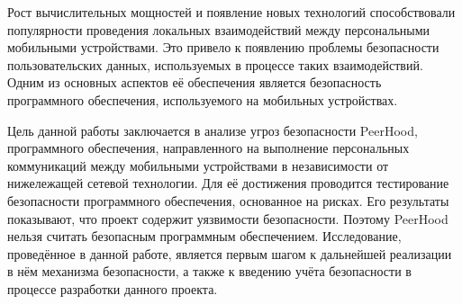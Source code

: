 %
Рост вычислительных мощностей и появление новых технологий способствовали популярности проведения локальных взаимодействий между персональными мобильными устройствами. 
%
Это привело к появлению проблемы безопасности пользовательских данных, используемых в процессе таких взаимодействий. 
%
Одним из основных аспектов её обеспечения является безопасность программного обеспечения, используемого на мобильных устройствах. 

%
Цель данной работы заключается в анализе угроз безопасности PeerHood, программного обеспечения, направленного на выполнение персональных коммуникаций между мобильными устройствами в независимости от нижележащей сетевой технологии. 
%
Для её достижения проводится тестирование безопасности программного обеспечения, основанное на рисках. 
%
Его результаты показывают, что проект содержит уязвимости безопасности.
%
Поэтому PeerHood нельзя считать безопасным программным обеспечением. 
%
Исследование, проведённое в данной работе, является первым шагом к дальнейшей реализации в нём механизма безопасности, а также к введению учёта безопасности в процессе разработки данного проекта.

